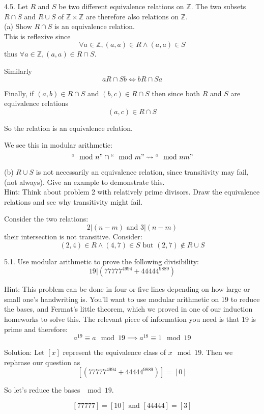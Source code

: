 \documentclass[16 pt]{amsart}
\theoremstyle{definition}
\theoremstyle{remark}
\numberwithin{equation}{subsection}
\newcommand{\Z}{\mathbb{Z}}
\begin{document}
4.5. Let $R$ and $S$ be two different equivalence relations on $\Z$.  The two subsets $R\cap S$ and $R\cup S$ of $\Z\times \Z$ are therefore also relations on $\Z$.\\

(a) Show $R\cap S$ is an equivalence relation.\\

This is reflexive since 
\[
\forall a\in \Z, (a,a)\in R \wedge (a,a)\in S
\]
thus $\forall a\in\Z, (a,a)\in R\cap S$.


Similarly 
\[
a R\cap S b \iff b R\cap S a
\]

Finally, if $(a,b)\in R\cap S$ and $(b,c)\in R\cap S$ then since both $R$ and $S$ are equivalence relations
\[
(a,c)\in R\cap S
\]

So the relation is an equivalence relation.


We see this in modular arithmetic:
\[
``\mod n" \cap ``\mod m" \rightsquigarrow ``\mod nm"
\]


(b) $R\cup S$ is not necessarily an equivalence relation, since transitivity may fail, (not always).  Give an example to demonstrate this.\\
Hint: Think about problem 2 with relatively prime divisors.  Draw the equivalence relations and see why transitivity might fail.


Consider the two relations:
\[
2|(n-m) \text{ and } 3|(n-m)
\]
their intersection is not transitive.  Consider:
\[
(2,4)\in R \wedge (4,7)\in S \text{ but } (2,7)\notin R\cup S
\]

\newpage 

5.1. Use modular arithmetic to prove the following divisibility:
\[
19 | (77777^{4994}+ 44444^{9889})
\]

Hint: This problem can be done in four or five lines depending on how large or small one's handwriting is.  You'll want to use modular arithmetic on 19 to reduce the bases, and Fermat's little theorem, which we proved in one of our induction homeworks to solve this.  The relevant piece of information you need is that 19 is prime and therefore:
\[
a^{19} \equiv a \mod{19} \implies a^{18}\equiv 1 \mod{19}
\]



Solution:  Let $[x]$ represent the equivalence class of $x \mod 19$.  Then we rephrase our question as
\[
[(77777^{4994}+ 44444^{9889})] = [0]
\]

So let's reduce the bases $\mod 19$.

\[
[77777] = [10] \text{ and } [44444] = [3]
\]
\end{document}

